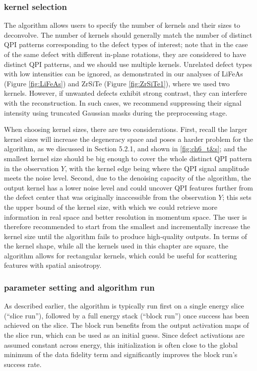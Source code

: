 \subsubsection{kernel selection}
The algorithm allows users to specify the number of kernels and their sizes to deconvolve. The number of kernels should generally match the number of distinct QPI patterns corresponding to the defect types of interest; note that in the case of the same defect with different in-plane rotations, they are considered to have distinct QPI patterns, and we should use multiple kernels. Unrelated defect types with low intensities can be ignored, as demonstrated in our analyses of LiFeAs (Figure \ref{fig:LiFeAs}) and ZrSiTe (Figure \ref{fig:ZrSiTe1}), where we used two kernels. However, if unwanted defects exhibit strong contrast, they can interfere with the reconstruction. In such cases, we recommend suppressing their signal intensity using truncated Gaussian masks during the preprocessing stage. 

When choosing kernel sizes, there are two considerations. First, recall the larger kernel sizes will increase the degeneracy space and poses a harder problem for the algorithm, as we discussed in Section 5.2.1, and shown in \ref{fig:ch6_t&s}; and the smallest kernel size should be big enough to cover the whole distinct QPI pattern in the observation $Y$, with the kernel edge being where the QPI signal amplitude meets the noise level. Second, due to the denoising capacity of the algorithm, the output kernel has a lower noise level and could uncover QPI features further from the defect center that was originally inaccessible from the observation $Y$; this sets the upper bound of the kernel size, with which we could retrieve more information in real space and better resolution in momentum space. The user is therefore recommended to start from the smallest and incrementally increase the kernel size until the algorithm fails to produce high-quality outputs. In terms of the kernel shape, while all the kernels used in this chapter are square, the algorithm allows for rectangular kernels, which could be useful for scattering features with spatial anisotropy.

\subsubsection{parameter setting and algorithm run}
As described earlier, the algorithm is typically run first on a single energy slice (“slice run”), followed by a full energy stack (“block run”) once success has been achieved on the slice. The block run benefits from the output activation maps of the slice run, which can be used as an initial guess. Since defect activations are assumed constant across energy, this initialization is often close to the global minimum of the data fidelity term and significantly improves the block run’s success rate.

